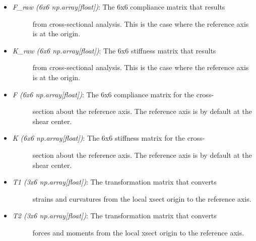 \documentclass[letterpaper,10pt,english]{sphinxmanual}
\begin{document}
\begin{fulllineitems}
\begin{itemize}
\item {} \begin{description}
\item[{\emph{F\_raw (6x6 np.array{[}float{]})}: The 6x6 compliance matrix that results}] \leavevmode
from cross-sectional analysis. This is the case where the reference
axis is at the origin.

\end{description}

\item {} \begin{description}
\item[{\emph{K\_raw (6x6 np.array{[}float{]})}: The 6x6 stiffness matrix that results}] \leavevmode
from cross-sectional analysis. This is the case where the reference
axis is at the origin.

\end{description}

\item {} \begin{description}
\item[{\emph{F (6x6 np.array{[}float{]})}: The 6x6 compliance matrix for the cross-}] \leavevmode
section about the reference axis. The reference axis is by default
at the shear center.

\end{description}

\item {} \begin{description}
\item[{\emph{K (6x6 np.array{[}float{]})}: The 6x6 stiffness matrix for the cross-}] \leavevmode
section about the reference axis. The reference axis is by default
at the shear center.

\end{description}

\item {} \begin{description}
\item[{\emph{T1 (3x6 np.array{[}float{]})}: The transformation matrix that converts}] \leavevmode
strains and curvatures from the local xsect origin to the reference
axis.

\end{description}

\item {} \begin{description}
\item[{\emph{T2 (3x6 np.array{[}float{]})}: The transformation matrix that converts}] \leavevmode
forces and moments from the local xsect origin to the reference
axis.


\end{description}
\end{itemize}
\end{fulllineitems}
\end{document}

